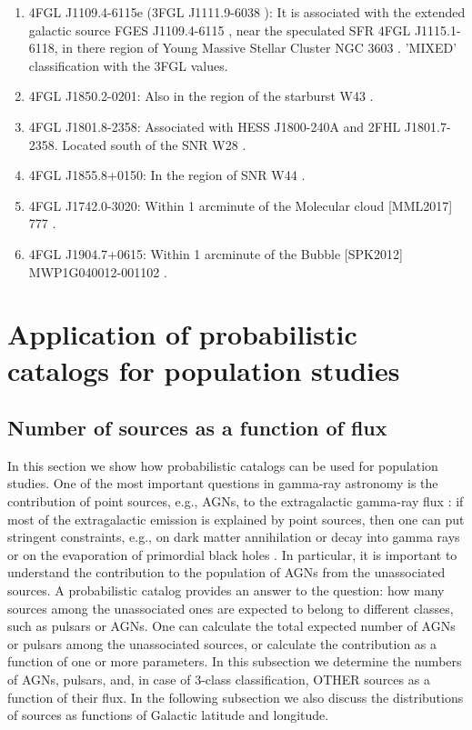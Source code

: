 \documentclass{aa}
\newcommand{\lb}{\label}
\begin{document}
\begin{enumerate}
\item 4FGL J1109.4-6115e (3FGL J1111.9-6038 \citep{2015ApJS..218...23A}): It is associated with the extended galactic source FGES J1109.4-6115 \citep{2017ApJ...843..139A}, near the speculated SFR 4FGL J1115.1-6118, in there region of Young Massive Stellar Cluster NGC 3603 \citep{2020ApJ...897..131S}. 'MIXED' classification with the 3FGL values.
\item 4FGL J1850.2-0201: Also in the region of the starburst W43 \citep{2020A&A...640A..60Y}.
\item 4FGL J1801.8-2358: Associated with HESS J1800-240A and 2FHL J1801.7-2358. Located south of the SNR W28 \citep{2020MNRAS.495.2909R}.
\item 4FGL J1855.8+0150: In the region of SNR W44 \citep{2020ApJ...896L..23P}.
\item 4FGL J1742.0-3020: Within 1 arcminute of the Molecular cloud [MML2017] 777 \citep{2017ApJ...834...57M}.
\item 4FGL J1904.7+0615: Within 1 arcminute of the Bubble [SPK2012] MWP1G040012-001102 \citep{2012MNRAS.424.2442S}.
\end{enumerate}

\section{Application of probabilistic catalogs for population studies}
\lb{sec:pop_studies}

\subsection{Number of sources as a function of flux}
\lb{sec:dNdS}


In this section we show how probabilistic catalogs can be used for population studies.
One of the most important questions in gamma-ray astronomy is the contribution of point sources, 
e.g., AGNs, to the extragalactic gamma-ray flux 
\citep[e.g.,][]{2010ApJ...720..435A, 2011ApJ...738..181M, 2016PhRvL.116o1105A, 2016ApJS..225...18Z, 2016ApJ...826L..31Z, 2016ApJ...832..117L, 2018ApJ...856..106D}:
if most of the extragalactic emission is explained by point sources, then one can put stringent constraints, 
e.g., on  dark matter annihilation or decay into gamma rays 
\citep{2015ApJ...800L..27A, 2015PhRvD..91l3001D, 2015JCAP...09..008F, 2015PhR...598....1F, 2017ChPhC..41d5104L} or 
on the evaporation of primordial black holes \citep{2010PhRvD..81j4019C}.
In particular, it is important to understand the contribution to the population of AGNs from the unassociated sources.
A probabilistic catalog provides an answer to the question: how many sources among the unassociated ones are expected to belong to different classes, such as pulsars or AGNs. 
One can calculate the total expected number of AGNs or pulsars among the unassociated sources, or calculate the contribution as a function of one or more parameters.
In this subsection we determine the numbers of AGNs, pulsars, and, in case of 3-class classification, OTHER sources as a function of their flux.
In the following subsection we also discuss the distributions of sources as functions
of Galactic latitude and longitude.
\end{document}
